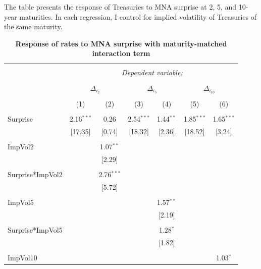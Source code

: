 \documentclass[12pt]{article}
\begin{document}
\begin{table}[!htbp] \centering 
  \caption{\textbf{Response of rates to MNA surprise with maturity-matched interaction term}} 
  \label{} 
  \begin{flushleft}
    {\medskip\small
 The table presents the response of Treasuries to MNA surprise at 2, 5, and 10-year maturities. In each regression, I control for implied volatility of Treasuries of the same maturity.}
    \medskip
    \end{flushleft}
\begin{tabular}{@{\extracolsep{5pt}}lcccccc} 
\\[-1.8ex]\hline 
\hline \\[-1.8ex] 
 & \multicolumn{6}{c}{\textit{Dependent variable:}} \\ 
\cline{2-7} 
\\[-1.8ex] & \multicolumn{2}{c}{$\Delta_{i_2}$} & \multicolumn{2}{c}{$\Delta_{i_5}$} & \multicolumn{2}{c}{$\Delta_{i_{10}}$} \\ 
\\[-1.8ex] & (1) & (2) & (3) & (4) & (5) & (6)\\ 
\hline \\[-1.8ex] 
 Surprise & 2.16$^{***}$ & 0.26 & 2.54$^{***}$ & 1.44$^{**}$ & 1.85$^{***}$ & 1.65$^{***}$ \\ 
  & [17.35] & [0.74] & [18.32] & [2.36] & [18.52] & [3.24] \\ 
  & & & & & & \\ 
 ImpVol2 &  & 1.07$^{**}$ &  &  &  &  \\ 
  &  & [2.29] &  &  &  &  \\ 
  & & & & & & \\ 
 Surprise*ImpVol2 &  & 2.76$^{***}$ &  &  &  &  \\ 
  &  & [5.72] &  &  &  &  \\ 
  & & & & & & \\ 
 ImpVol5 &  &  &  & 1.57$^{**}$ &  &  \\ 
  &  &  &  & [2.19] &  &  \\ 
  & & & & & & \\ 
 Surprise*ImpVol5 &  &  &  & 1.28$^{*}$ &  &  \\ 
  &  &  &  & [1.82] &  &  \\ 
  & & & & & & \\ 
 ImpVol10 &  &  &  &  &  & 1.03$^{*}$ \\ 

\end{tabular}
\end{table}
\end{document}
